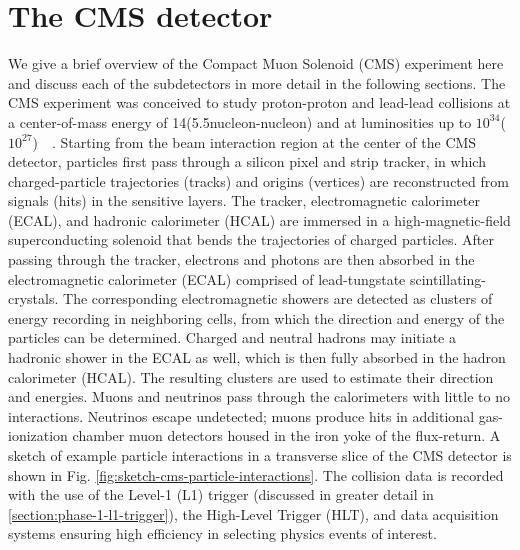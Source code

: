 \section{The CMS detector}
\label{section:cms-detector}
We give a brief overview of the Compact Muon Solenoid (CMS) experiment here and discuss each of the subdetectors in more detail in the following sections. The CMS experiment was conceived to study proton-proton and lead-lead collisions at a center-of-mass energy of 14\TeV (5.5\TeV nucleon-nucleon) and at luminosities up to $10^{34}$\percms ($10^{27}$\percms)~\cite{CMS-2008-JINST-3-S08004}~\cite{CERN-EP-2017-110}. Starting from the beam interaction region at the center of the CMS detector, particles first pass through a silicon pixel and strip tracker, in which charged-particle trajectories (tracks) and origins (vertices) are reconstructed from signals (hits) in the sensitive layers. The tracker, electromagnetic calorimeter (ECAL), and hadronic calorimeter (HCAL) are immersed in a high-magnetic-field superconducting solenoid that bends the trajectories of charged particles. After passing through the tracker, electrons and photons are then absorbed in the electromagnetic calorimeter (ECAL) comprised of lead-tungstate scintillating-crystals. The corresponding electromagnetic showers are detected as clusters of energy recording in neighboring cells, from which the direction and energy of the particles can be determined. Charged and neutral hadrons may initiate a hadronic shower in the ECAL as well, which is then fully absorbed in the hadron calorimeter (HCAL). The resulting clusters are used to estimate their direction and energies. Muons and neutrinos pass through the calorimeters with little to no interactions. Neutrinos escape undetected; muons produce hits in additional gas-ionization chamber muon detectors housed in the iron yoke of the flux-return. A sketch of example particle interactions in a transverse slice of the CMS detector is shown in Fig. \ref{fig:sketch-cms-particle-interactions}. The collision data is recorded with the use of the Level-1 (L1) trigger (discussed in greater detail in \ref{section:phase-1-l1-trigger}), the High-Level Trigger (HLT), and data acquisition systems ensuring high efficiency in selecting physics events of interest. 

